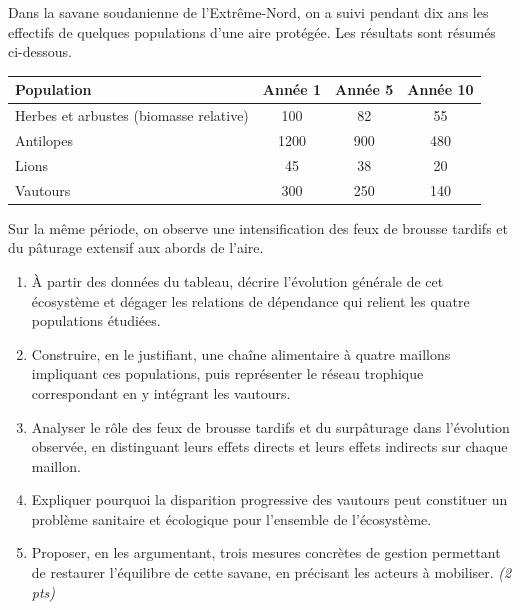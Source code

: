 \documentclass[11pt]{article}
\begin{document}
\begin{exercice}
Dans la savane soudanienne de l'Extrême-Nord, on a suivi pendant dix ans les effectifs de quelques populations d'une aire protégée. Les résultats sont résumés ci-dessous.

\begin{center}
\begin{tabular}{|l|c|c|c|}
\hline
\textbf{Population} & \textbf{Année 1} & \textbf{Année 5} & \textbf{Année 10} \\
\hline
Herbes et arbustes (biomasse relative) & 100 & 82 & 55 \\
\hline
Antilopes & 1200 & 900 & 480 \\
\hline
Lions & 45 & 38 & 20 \\
\hline
Vautours & 300 & 250 & 140 \\
\hline
\end{tabular}
\end{center}

Sur la même période, on observe une intensification des feux de brousse tardifs et du pâturage extensif aux abords de l'aire.

\begin{enumerate}
\item À partir des données du tableau, décrire l'évolution générale de cet écosystème et dégager les relations de dépendance qui relient les quatre populations étudiées.
\item Construire, en le justifiant, une chaîne alimentaire à quatre maillons impliquant ces populations, puis représenter le réseau trophique correspondant en y intégrant les vautours.
\item Analyser le rôle des feux de brousse tardifs et du surpâturage dans l'évolution observée, en distinguant leurs effets directs et leurs effets indirects sur chaque maillon.
\item Expliquer pourquoi la disparition progressive des vautours peut constituer un problème sanitaire et écologique pour l'ensemble de l'écosystème.
\item Proposer, en les argumentant, trois mesures concrètes de gestion permettant de restaurer l'équilibre de cette savane, en précisant les acteurs à mobiliser. \textit{(2 pts)}
\end{enumerate}
\end{exercice}
\end{document}
